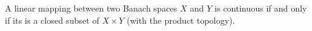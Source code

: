 \documentclass[12pt]{article}
\begin{document}
A linear mapping between two Banach spaces $X$ and $Y$ is continuous if and only if its  is a closed subset of $X\times Y$ (with the product topology).
\end{document}

